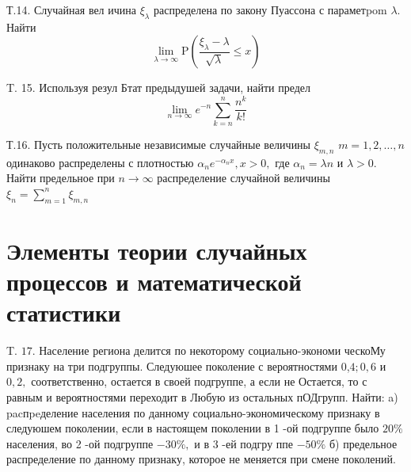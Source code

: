 \documentclass[a4paper,12pt]{article} %
\begin{document}
\begin{example}

Т.14. Случайная вел ичина $\xi_{\lambda}$ распределена по закону Пуассона с параметpom $\lambda .$ Найти
$$
\lim _{\lambda \rightarrow \infty} \mathrm{P}\left(\frac{\xi_{\lambda}-\lambda}{\sqrt{\lambda}} \leqslant x\right)
$$




\end{example}



\begin{example}

T. 15. Используя резул Бтат предыдушей задачи, найти предел
$$
\lim _{n \rightarrow \infty} e^{-n} \sum_{k=n}^{n} \frac{n^{k}}{k !}
$$




\end{example}





\begin{example}

Т.16. Пусть положительные независимые случайные величины $\xi_{m, n}$ $m=1,2, \ldots, n$ одинаково распределены с плотностью $\alpha_{n} e^{-\alpha_{n} x}, x>0,$ где $\alpha_{n}=\lambda n$ и $\lambda>0 .$ Найти предельное при $n \rightarrow \infty$ распределение случайной величины $\xi_{n}=\sum_{m=1}^{n} \xi_{m, n}$




\end{example}


\section{Элементы теории случайных процессов и математической статистики}




\begin{example}


T. $17 .$ Население региона делится по некоторому социально-экономи ческоМу признаку на три подгруппы. Следуюшее поколение с вероятностями 0,$4 ; 0,6$ и $0,2,$ соответственно, остается в своей подгруппе, а если не
Остается, то с равным и вероятностями переходит в Любую из остальных пОДгрупп. Найти:
a) pacпpeделение населения по данному социально-экономическому признаку в следуюшем поколении, если в настоящем поколении в 1 -ой подгруппе было $20 \%$ населения, во 2 -ой подгруппе $-30 \%,$ и в 3 -ей подгру ппе $-50 \%$
б) предельное распределение по данному признаку, которое не меняется при смене поколений.



\end{example}
\end{document}
